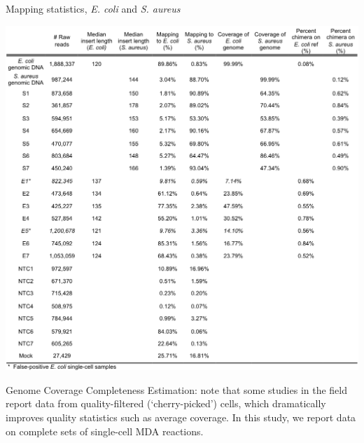 \begin{table}
\caption{Mapping statistics, \textit{E. coli} and \textit{S. aureus}}
\label{tab:MapStatES}
\includegraphics[width=\linewidth]{./figures/MapStatES}
\end{table}

Genome Coverage Completeness Estimation: note that some studies in the field report data from quality-filtered (`cherry-picked') cells, which dramatically improves quality statistics such as average coverage. In this study, we report data on complete sets of single-cell MDA reactions. 

